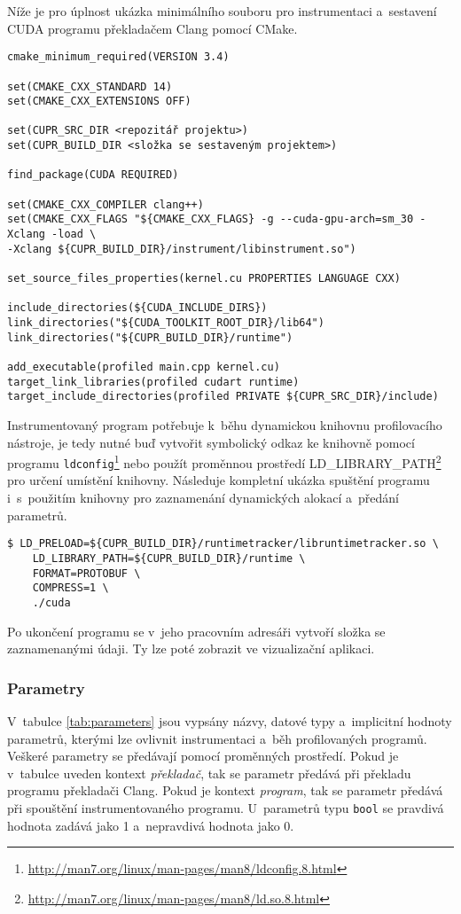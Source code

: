 Níže je pro úplnost ukázka minimálního souboru pro instrumentaci a~sestavení CUDA programu překladačem Clang pomocí CMake.


\begin{verbatim}
cmake_minimum_required(VERSION 3.4)

set(CMAKE_CXX_STANDARD 14)
set(CMAKE_CXX_EXTENSIONS OFF)

set(CUPR_SRC_DIR <repozitář projektu>)
set(CUPR_BUILD_DIR <složka se sestaveným projektem>)

find_package(CUDA REQUIRED)

set(CMAKE_CXX_COMPILER clang++)
set(CMAKE_CXX_FLAGS "${CMAKE_CXX_FLAGS} -g --cuda-gpu-arch=sm_30 -Xclang -load \
-Xclang ${CUPR_BUILD_DIR}/instrument/libinstrument.so")

set_source_files_properties(kernel.cu PROPERTIES LANGUAGE CXX)

include_directories(${CUDA_INCLUDE_DIRS})
link_directories("${CUDA_TOOLKIT_ROOT_DIR}/lib64")
link_directories("${CUPR_BUILD_DIR}/runtime")

add_executable(profiled main.cpp kernel.cu)
target_link_libraries(profiled cudart runtime)
target_include_directories(profiled PRIVATE ${CUPR_SRC_DIR}/include)
\end{verbatim}


Instrumentovaný program potřebuje k~běhu dynamickou knihovnu profilovacího nástroje, je tedy nutné buď vytvořit symbolický odkaz ke knihovně pomocí programu \texttt{ldconfig}\footnote{\url{http://man7.org/linux/man-pages/man8/ldconfig.8.html}} nebo použít proměnnou prostředí LD\_LIBRARY\_PATH\footnote{\url{http://man7.org/linux/man-pages/man8/ld.so.8.html}} pro určení umístění knihovny. Následuje kompletní ukázka spuštění programu i~s~použitím knihovny pro zaznamenání dynamických alokací a~předání parametrů.

\begin{verbatim}
$ LD_PRELOAD=${CUPR_BUILD_DIR}/runtimetracker/libruntimetracker.so \
    LD_LIBRARY_PATH=${CUPR_BUILD_DIR}/runtime \
    FORMAT=PROTOBUF \
    COMPRESS=1 \
    ./cuda
\end{verbatim}

Po ukončení programu se v~jeho pracovním adresáři vytvoří složka se zaznamenanými údaji. Ty lze poté zobrazit ve vizualizační aplikaci.

\subsubsection{Parametry}
\label{manual:parameters}
V~tabulce \ref{tab:parameters} jsou vypsány názvy, datové typy a~implicitní hodnoty parametrů, kterými lze ovlivnit instrumentaci a~běh profilovaných programů. Veškeré parametry se předávají pomocí proměnných prostředí. Pokud je v~tabulce uveden kontext \emph{překladač}, tak se parametr předává při překladu programu překladači Clang. Pokud je kontext \emph{program}, tak se parametr předává při spouštění instrumentovaného programu. U~parametrů typu \texttt{bool} se pravdivá hodnota zadává jako 1 a~nepravdivá hodnota jako 0.

